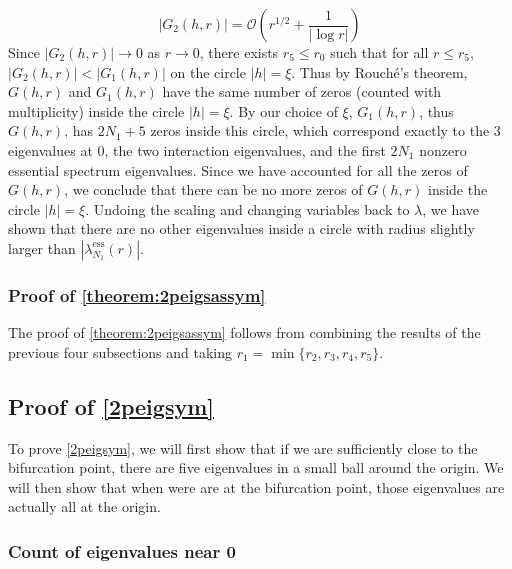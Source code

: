 \documentclass[thesis.tex]{subfiles}
\begin{document}
\[
|G_2(h,r)| = \mathcal{O}\left( r^{1/2} + \frac{1}{|\log r|} \right)
\]
Since $|G_2(h,r)| \rightarrow 0$ as $r \rightarrow 0$, there exists $r_5 \leq r_0$ such that for all $r \leq r_5$, $|G_2(h,r)| < |G_1(h,r)|$ on the circle $|h| = \xi$. Thus by Rouch\'{e}'s theorem, $G(h,r)$ and $G_1(h,r)$ have the same number of zeros (counted with multiplicity) inside the circle $|h| = \xi$. By our choice of $\xi$, $G_1(h,r)$, thus $G(h,r)$, has $2 N_1 + 5$ zeros inside this circle, which correspond exactly to the 3 eigenvalues at 0, the two interaction eigenvalues, and the first $2 N_1$ nonzero essential spectrum eigenvalues. Since we have accounted for all the zeros of $G(h,r)$, we conclude that there can be no more zeros of $G(h,r)$ inside the circle $|h| = \xi$. Undoing the scaling and changing variables back to $\lambda$, we have shown that there are no other eigenvalues inside a circle with radius slightly larger than $|\lambda_{N_1}^{\text{ess}}(r)|$.

\subsubsection{Proof of \cref{theorem:2peigsassym}}

The proof of \cref{theorem:2peigsassym} follows from combining the results of the previous four subsections and taking $r_1 = \min\{ r_2, r_3, r_4, r_5 \}$.

\subsection{Proof of \cref{2peigsym}}

To prove \cref{2peigsym}, we will first show that if we are sufficiently close to the bifurcation point, there are five eigenvalues in a small ball around the origin. We will then show that when were are at the bifurcation point, those eigenvalues are actually all at the origin.

\subsubsection{Count of eigenvalues near 0}
\end{document}
